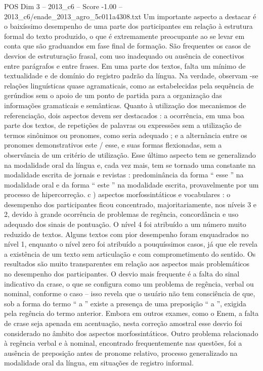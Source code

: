 \begin{textsample}{POS Dim 3 – 2013\_c6 – Score -1.00 – 2013\_c6/enade\_2013\_agro\_5c011a4308.txt}
Um importante aspecto a destacar é o baixíssimo desempenho de uma parte dos participantes em relação à estrutura formal do texto produzido, o que é extremamente preocupante ao se levar em conta que são graduandos em fase final de formação.
São frequentes os casos de desvios de estruturação frasal, com uso inadequado ou ausência de conectivos entre parágrafos e entre frases.
Em uma parte dos textos, falta um mínimo de textualidade e de domínio do registro padrão da língua.
Na verdade, observam -se relações linguísticas quase agramaticais, como as estabelecidas pela sequência de gerúndios sem o apoio de um ponto de partida para a organização das informações gramaticais e semânticas.
Quanto à utilização dos mecanismos de referenciação, dois aspectos devem ser destacados : a ocorrência, em uma boa parte dos textos, de repetições de palavras ou expressões sem a utilização de termos sinônimos ou pronomes, como seria adequado ; e a alternância entre os pronomes demonstrativos este / esse, e suas formas flexionadas, sem a observância de um critério de utilização.
Esse último aspecto tem se generalizado na modalidade oral da língua e, cada vez mais, tem se tornado uma constante na modalidade escrita de jornais e revistas : predominância da forma “ esse ” na modalidade oral e da forma “ este ” na modalidade escrita, provavelmente por um processo de hipercorreção. c ) aspectos morfossintáticos e vocabulares : o desempenho dos participantes ficou concentrado, majoritariamente, nos níveis 3 e 2, devido à grande ocorrência de problemas de regência, concordância e uso adequado dos sinais de pontuação.
O nível 4 foi atribuído a um número muito reduzido de textos.
Alguns textos com pior desempenho foram enquadrados no nível 1, enquanto o nível zero foi atribuído a pouquíssimos casos, já que ele revela a existência de um texto sem articulação e com comprometimento do sentido.
Os resultados são muito transparentes em relação aos aspectos mais problemáticos no desempenho dos participantes.
O desvio mais frequente é a falta do sinal indicativo da crase, o que se configura como um problema de regência, verbal ou nominal, conforme o caso – isso revela que o usuário não tem consciência de que, sob a forma do termo “ a ” existe a presença de uma preposição “ a ”, exigida pela regência do termo anterior.
Embora em outros exames, como o Enem, a falta de crase seja apenada em acentuação, nesta correção amostral esse desvio foi considerado no âmbito dos aspectos morfossintáticos.
Outro problema relacionado à regência verbal e à nominal, encontrado frequentemente nas questões, foi a ausência de preposição antes de pronome relativo, processo generalizado na modalidade oral da língua, em situações de registro informal.

\end{textsample}
